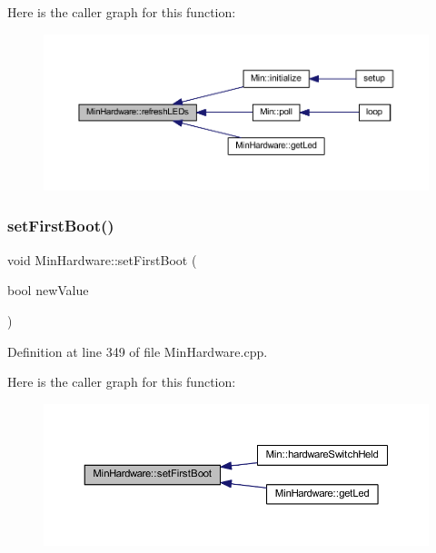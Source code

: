 Here is the caller graph for this function\+:
\nopagebreak
\begin{figure}[H]
\begin{center}
\leavevmode
\includegraphics[width=350pt]{class_min_hardware_a84e0d11e73681ef8b7a7e90628b827ab_icgraph}
\end{center}
\end{figure}
\mbox{\label{class_min_hardware_a84cd3aa52662d5f6e599035a812894f9}} 
\subsubsection{\texorpdfstring{set\+First\+Boot()}{setFirstBoot()}}
{\footnotesize\ttfamily void Min\+Hardware\+::set\+First\+Boot (\begin{DoxyParamCaption}\item[{bool}]{new\+Value }\end{DoxyParamCaption})}



Definition at line 349 of file Min\+Hardware.\+cpp.

Here is the caller graph for this function\+:
\nopagebreak
\begin{figure}[H]
\begin{center}
\leavevmode
\includegraphics[width=350pt]{class_min_hardware_a84cd3aa52662d5f6e599035a812894f9_icgraph}
\end{center}
\end{figure}
\mbox{\label{class_min_hardware_a9a29bee58534914c24171d362e78bd2a}} 
